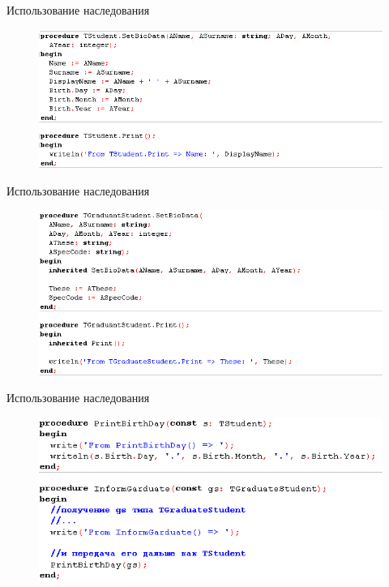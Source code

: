 \documentclass{beamer}
\begin{document}
\begin{frame}{Использование наследования}
\begin{figure}[h]
\centering
\includegraphics[scale=0.6]{images/lec06-pic15.png}
\end{figure}
\end{frame}

\begin{frame}{Использование наследования}
\begin{figure}[h]
\centering
\includegraphics[scale=0.6]{images/lec06-pic16.png}
\end{figure}
\end{frame}

\begin{frame}{Использование наследования}
\begin{figure}[h]
\centering
\includegraphics[scale=0.6]{images/lec06-pic17.png}
\end{figure}
\end{frame}
\end{document}
